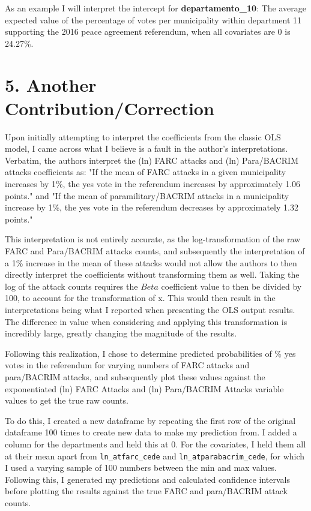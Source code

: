 \documentclass[12pt,letterpaper]{article}
\begin{document}
	As an example I will interpret the intercept for \textbf{departamento\_10}: The average expected value of the percentage of votes per municipality within department 11 supporting the 2016 peace agreement referendum, when all covariates are 0 is 24.27\%.
	
	\section*{5. Another Contribution/Correction}
	
	Upon initially attempting to interpret the coefficients from the classic OLS model, I came across what I believe is a fault in the author's interpretations. Verbatim, the authors interpret the (ln) FARC attacks and (ln) Para/BACRIM attacks coefficients as: "If the mean of FARC attacks in a given municipality increases by 1\%, the yes vote in the referendum increases by approximately 1.06 points." and "If the mean of paramilitary/BACRIM attacks in a municipality increase by 1\%, the yes vote in the referendum decreases by approximately 1.32 points."
	
	This interpretation is not entirely accurate, as the log-transformation of the raw FARC and Para/BACRIM attacks counts, and subsequently the interpretation of a 1\% increase in the mean of these attacks would not allow the authors to then directly interpret the coefficients without transforming them as well. Taking the log of the attack counts requires the $Beta$ coefficient value to then be divided by 100, to account for the transformation of x. This would then result in the interpretations being what I reported when presenting the OLS output results. The difference in value when considering and applying this transformation is incredibly large, greatly changing the magnitude of the results.
	
	Following this realization, I chose to determine predicted probabilities of \% yes votes in the referendum for varying numbers of FARC attacks and para/BACRIM attacks, and subsequently plot these values against the exponentiated (ln) FARC Attacks and (ln) Para/BACRIM Attacks variable values to get the true raw counts.
	
	To do this, I created a new dataframe by repeating the first row of the original dataframe 100 times to create new data to make my prediction from. I added a column for the departments and held this at 0. For the covariates, I held them all at their mean apart from \texttt{ln\_atfarc\_cede} and \texttt{ln\_atparabacrim\_cede}, for which I used a varying sample of 100 numbers between the min and max values. Following this, I generated my predictions and calculated confidence intervals before plotting the results against the true FARC and para/BACRIM attack counts.
	
\end{document}
